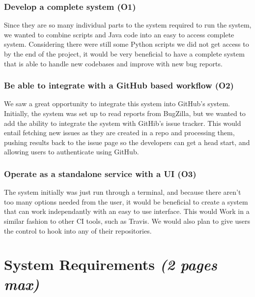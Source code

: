 \documentclass[12pt]{article}
\begin{document}
\hypertarget{develop-a-complete-system-o1}{%
\subsubsection{Develop a complete system
(O1)}\label{develop-a-complete-system-o1}}

Since they are so many individual parts to the system required to run
the system, we wanted to combine scripts and Java code into an easy to
access complete system. Considering there were still some Python scripts
we did not get access to by the end of the project, it would be very
beneficial to have a complete system that is able to handle new
codebases and improve with new bug reports.

\hypertarget{be-able-to-integrate-with-a-github-based-workflow-o2}{%
\subsubsection{Be able to integrate with a GitHub based workflow
(O2)}\label{be-able-to-integrate-with-a-github-based-workflow-o2}}

We saw a great opportunity to integrate this system into GitHub's
system. Initially, the system was set up to read reports from BugZilla,
but we wanted to add the ability to integrate the system with GitHib's
issue tracker. This would entail fetching new issues as they are created
in a repo and processing them, pushing results back to the issue page so
the developers can get a head start, and allowing users to authenticate
using GitHub.

\hypertarget{operate-as-a-standalone-service-with-a-ui-o3}{%
\subsubsection{Operate as a standalone service with a UI
(O3)}\label{operate-as-a-standalone-service-with-a-ui-o3}}

The system initially was just run through a terminal, and because there
aren't too many options needed from the user, it would be beneficial to
create a system that can work independantly with an easy to use
interface. This would Work in a similar fashion to other CI tools, such
as Travis. We would also plan to give users the control to hook into any
of their repositories.

\hypertarget{system-requirements-2-pages-max}{%
\section{\texorpdfstring{System Requirements \emph{(2 pages
max)}}{System Requirements (2 pages max)}}\label{system-requirements-2-pages-max}}
\end{document}
